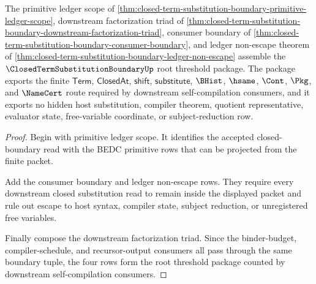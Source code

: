 \begin{theorem}
\label{thm:closed-term-substitution-boundary-namecert-threshold-package}
The primitive ledger scope of \autoref{thm:closed-term-substitution-boundary-primitive-ledger-scope}, downstream factorization triad of \autoref{thm:closed-term-substitution-boundary-downstream-factorization-triad}, consumer boundary of \autoref{thm:closed-term-substitution-boundary-consumer-boundary}, and ledger non-escape theorem of \autoref{thm:closed-term-substitution-boundary-ledger-non-escape} assemble the $\ClosedTermSubstitutionBoundaryUp$ root threshold package. The package exports the finite $\mathsf{Term}$, $\mathsf{ClosedAt}$, $\mathsf{shift}$, $\mathsf{substitute}$, $\BHist$, $\hsame$, $\Cont$, $\Pkg$, and $\NameCert$ route required by downstream self-compilation consumers, and it exports no hidden host substitution, compiler theorem, quotient representative, evaluator state, free-variable coordinate, or subject-reduction row.
\end{theorem}
\begin{proof}
Begin with primitive ledger scope. It identifies the accepted closed-boundary read with the BEDC primitive rows that can be projected from the finite packet.

Add the consumer boundary and ledger non-escape rows. They require every downstream closed substitution read to remain inside the displayed packet and rule out escape to host syntax, compiler state, subject reduction, or unregistered free variables.

Finally compose the downstream factorization triad. Since the binder-budget, compiler-schedule, and recursor-output consumers all pass through the same boundary tuple, the four rows form the root threshold package counted by downstream self-compilation consumers.
\end{proof}
